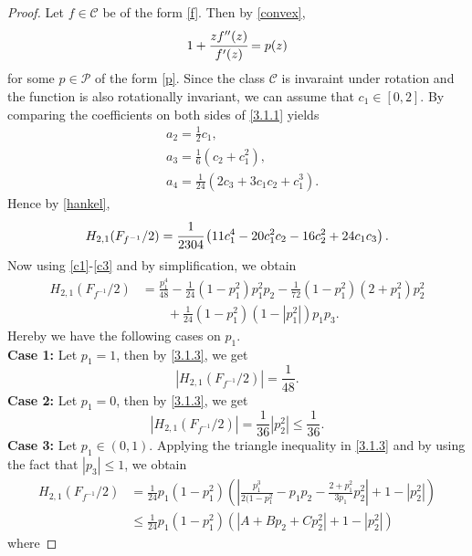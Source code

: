 \documentclass[10pt,a4paper]{amsart}
\begin{document}
\begin{proof}
Let $f\in \mathcal{C}$ be of the form \eqref{f}. Then by \eqref{convex},
\begin{equation}\label{3.1.1}
1+\cfrac{zf''(z)}{f'(z)}=p(z)
\end{equation}
for some $p \in \mathcal{P}$ of the form \eqref{p}. 
Since the class $\mathcal{C}$ is invaraint under rotation and the function is also rotationally invariant, we can assume that $c_1 \in [0,2]$.
By comparing the coefficients on both sides of \eqref{3.1.1} yields
	\begin{equation}\label{3.2.2}
		\begin{aligned}
			& a_2=\frac{1}{2}c_1, \\[2mm]
			& a_3=\frac{1}{6}(c_2+c_1^2), \\[2mm]
			& a_4=\frac{1}{24}\left(2c_3+3c_1c_2+c_1^3 \right).
		\end{aligned}
	\end{equation}
Hence by \eqref{hankel},
$$
H_{2,1}(F_{f^{-1}}/2)=\cfrac{1}{2304}\left(11c_1^4-20c_1^2c_2-16c_2^2+24c_1c_3\right).
$$
Now using \eqref{c1}-\eqref{c3} and by simplification, we obtain
\begin{equation}\label{3.1.3}
\begin{aligned}
H_{2,1}(F_{f^{-1}}/2)
&=\frac{p_1^4}{48}-\frac{1}{24}(1-p_1^2)p_1^2p_2-\frac{1}{72}(1-p_1^2)(2+p_1^2)p_2^2\\
& \quad \quad +\frac{1}{24}(1-p_1^2)(1-|p_1^2|)p_1p_3.
\end{aligned}
\end{equation}
Hereby we have the following cases on $p_1$.
\\[1mm]
\textbf{Case 1:} Let $p_1=1$, then by \eqref{3.1.3}, we get
$$
|H_{2,1}(F_{f^{-1}}/2)|=\frac{1}{48}.
$$
\textbf{Case 2:} Let $p_1=0$, then by \eqref{3.1.3}, we get
$$
|H_{2,1}(F_{f^{-1}}/2)|=\frac{1}{36}|p_2^2|\leq\frac{1}{36}.
$$
\textbf{Case 3:} Let $p_1 \in (0,1)$. Applying the triangle inequality in \eqref{3.1.3} and by using the fact
that $|p_3| \leq 1$, we obtain
\begin{equation}\label{3.1.4}
\begin{aligned}
H_{2,1}(F_{f^{-1}}/2)
&=\frac{1}{24}p_1(1-p_1^2)\left(\left| \frac{p_1^3}{2(1-p_1^2}-p_1 p_2-\frac{2+p_1^2}{3p_1}p_2^2 \right|+1-|p_2^2|\right)\\[2mm]
&\leq \frac{1}{24}p_1(1-p_1^2)\left(\left| A+B p_2+C p_2^2 \right|+1-|p_2^2|\right)
\end{aligned}
\end{equation}
where 

\end{proof}
\end{document}
